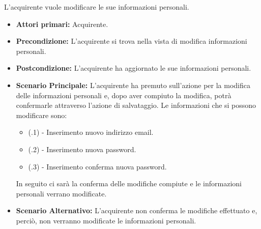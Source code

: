 
L'acquirente vuole modificare le sue informazioni personali.
\begin{itemize}
    \item \textbf{Attori primari:} Acquirente.
    \item \textbf{Precondizione:} L'acquirente si trova nella vista di modifica informazioni personali.
    \item \textbf{Postcondizione:} L'acquirente ha aggiornato le sue informazioni personali.
    \item \textbf{Scenario Principale:} L'acquirente ha premuto sull'azione per la modifica delle informazioni personali e, dopo aver compiuto la modifica, potrà confermarle attraverso l'azione di salvataggio. Le informazioni che si possono modificare sono:
    \begin{itemize}
        \item (\actualUC.1) - Inserimento nuovo indirizzo email.
        \item (\actualUC.2) - Inserimento nuova password.
        \item (\actualUC.3) - Inserimento conferma nuova password.
    \end{itemize}
    In seguito ci sarà la conferma delle modifiche compiute e le informazioni personali verrano modificate.
    \item \textbf{Scenario Alternativo:} L'acquirente non conferma le modifiche effettuato e, perciò, non verranno modificate le informazioni personali.
\end{itemize}
\resetSubUC

